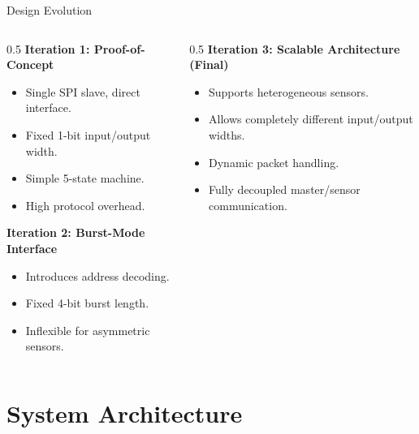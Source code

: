\documentclass{beamer}
\begin{document}
\begin{frame}{Design Evolution}
  \begin{columns}
    \begin{column}{0.5\textwidth}
      \textbf{Iteration 1: Proof-of-Concept}
      \begin{itemize}
        \item Single SPI slave, direct interface.
        \item Fixed 1-bit input/output width.
        \item Simple 5-state machine.
        \item High protocol overhead.
      \end{itemize}
      \vspace{0.2cm}
      \textbf{Iteration 2: Burst-Mode Interface}
      \begin{itemize}
        \item Introduces address decoding.
        \item Fixed 4-bit burst length.
        \item Inflexible for asymmetric sensors.
      \end{itemize}
    \end{column}
    \begin{column}{0.5\textwidth}
      \textbf{Iteration 3: Scalable Architecture (Final)}
      \begin{itemize}
        \item Supports heterogeneous sensors.
        \item Allows completely different input/output widths.
        \item Dynamic packet handling.
        \item Fully decoupled master/sensor communication.
      \end{itemize}
    \end{column}
  \end{columns}
\end{frame}

\section{System Architecture}
\end{document}
